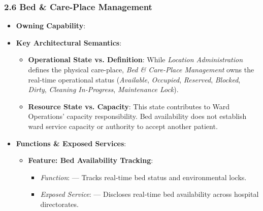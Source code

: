 \par\smallskip
{}\label{rad:hso:150}
\subsubsection*{2.6 Bed \& Care-Place Management}
\label{rad:hso:151}

\begin{itemize}

\item
\textbf{Owning Capability}: \texttt{}



\item
\textbf{Key Architectural Semantics}:


\begin{itemize}

\item
\textbf{Operational State vs. Definition}: While \emph{Location Administration} defines the physical care-place, \emph{Bed \& Care-Place Management} owns the real-time operational status (\emph{Available}, \emph{Occupied}, \emph{Reserved}, \emph{Blocked}, \emph{Dirty}, \emph{Cleaning In-Progress}, \emph{Maintenance Lock}).



\item
\textbf{Resource State vs. Capacity}: This state contributes to Ward Operations' capacity responsibility. Bed availability does not establish ward service capacity or authority to accept another patient.



\end{itemize}


\item
\textbf{Functions \& Exposed Services}:


\begin{itemize}

\item
\textbf{Feature: Bed Availability Tracking}:


\begin{itemize}

\item
\emph{Function}: \texttt{} — Tracks real-time bed status and environmental locks.



\item
\emph{Exposed Service}: \texttt{} — Discloses real-time bed availability across hospital directorates.




\end{itemize}
\end{itemize}
\end{itemize}
